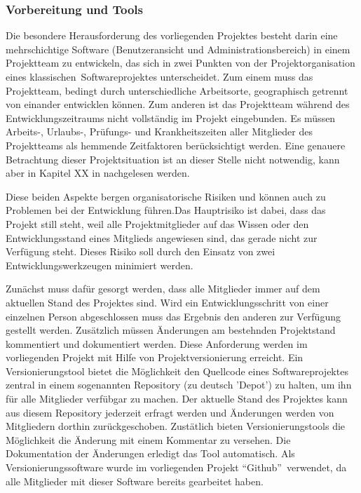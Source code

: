 \subsubsection{Vorbereitung und Tools}
\label{sec:VorbereitungUndTools}

Die besondere Herausforderung des vorliegenden Projektes besteht darin eine mehrschichtige Software (Benutzeransicht und Administrationsbereich) in einem Projektteam zu entwickeln, das sich in zwei Punkten von der Projektorganisation eines klassischen\footnotemark\ Softwareprojektes unterscheidet. Zum einem muss das Projektteam, bedingt durch unterschiedliche Arbeitsorte, geographisch getrennt von einander entwicklen können. Zum anderen ist das Projektteam während des Entwicklungszeitraums nicht vollständig im Projekt eingebunden. Es müssen Arbeits-, Urlaubs-, Prüfungs- und Krankheitszeiten aller Mitglieder des Projektteams als hemmende Zeitfaktoren berücksichtigt werden. Eine genauere Betrachtung dieser Projektsituation ist an dieser Stelle nicht notwendig, kann aber in Kapitel XX in \citet{unternehmensfuehrung2014} nachgelesen werden.


Diese beiden Aspekte bergen organisatorische Risiken und können auch zu Problemen bei der Entwicklung führen.Das
Hauptrisiko ist dabei, dass das Projekt still steht, weil alle Projektmitglieder auf das Wissen oder den Entwicklungsstand eines Mitglieds angewiesen sind, das gerade nicht zur Verfügung steht. Dieses Risiko soll durch den Einsatz von zwei Entwicklungswerkzeugen minimiert werden.

Zunächst muss dafür gesorgt werden, dass alle Mitglieder immer auf dem aktuellen Stand des Projektes sind. Wird ein Entwicklungsschritt von einer einzelnen Person abgeschlossen muss das Ergebnis den anderen zur Verfügung gestellt werden. Zusätzlich müssen Änderungen am bestehnden Projektstand kommentiert und dokumentiert werden. Diese Anforderung werden im vorliegenden Projekt mit Hilfe von Projektversionierung erreicht. Ein Versionierungstool bietet die Möglichkeit den Quellcode eines Softwareprojektes zentral in einem sogenannten Repository (zu deutsch 'Depot') zu halten, um ihn für alle Mitglieder verfübgar zu machen. Der aktuelle Stand des Projektes kann aus diesem Repository jederzeit erfragt werden und Änderungen werden von Mitgliedern dorthin zurückgeschoben. Zustätlich bieten Versionierungstools die Möglichkeit die Änderung mit einem Kommentar zu versehen. Die Dokumentation der Änderungen erledigt das Tool automatisch. Als Versionierungssoftware wurde im vorliegenden Projekt "`Github"'\footnotemark\ verwendet, da alle Mitglieder mit dieser Software bereits gearbeitet haben.

